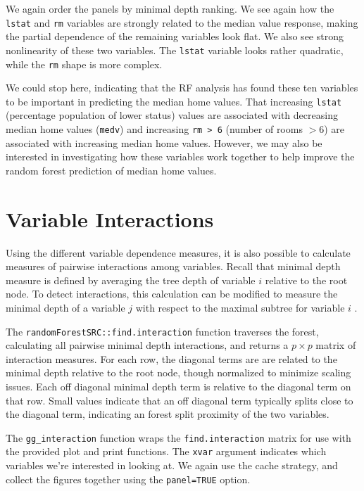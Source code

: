 \documentclass[article]{jss}
\begin{document}
We again order the panels by minimal depth ranking. We see again how the
\texttt{lstat} and \texttt{rm} variables are strongly related to the
median value response, making the partial dependence of the remaining
variables look flat. We also see strong nonlinearity of these two
variables. The \texttt{lstat} variable looks rather quadratic, while the
\texttt{rm} shape is more complex.

We could stop here, indicating that the RF analysis has found these ten
variables to be important in predicting the median home values. That
increasing \texttt{lstat} (percentage population of lower status) values
are associated with decreasing median home values (\texttt{medv}) and
increasing \texttt{rm\ \textgreater{}\ 6} (number of rooms \(> 6\)) are
associated with increasing median home values. However, we may also be
interested in investigating how these variables work together to help
improve the random forest prediction of median home values.

\section{Variable Interactions}\label{variable-interactions}

Using the different variable dependence measures, it is also possible to
calculate measures of pairwise interactions among variables. Recall that
minimal depth measure is defined by averaging the tree depth of variable
\(i\) relative to the root node. To detect interactions, this
calculation can be modified to measure the minimal depth of a variable
\(j\) with respect to the maximal subtree for variable \(i\)
\citep[\citet{Ishwaran:2011}]{Ishwaran:2010}.

The \texttt{randomForestSRC::find.interaction} function traverses the
forest, calculating all pairwise minimal depth interactions, and returns
a \(p \times p\) matrix of interaction measures. For each row, the
diagonal terms are are related to the minimal depth relative to the root
node, though normalized to minimize scaling issues. Each off diagonal
minimal depth term is relative to the diagonal term on that row. Small
values indicate that an off diagonal term typically splits close to the
diagonal term, indicating an forest split proximity of the two
variables.

The \texttt{gg\_interaction} function wraps the
\texttt{find.interaction} matrix for use with the provided plot and
print functions. The \texttt{xvar} argument indicates which variables
we're interested in looking at. We again use the cache strategy, and
collect the figures together using the \texttt{panel=TRUE} option.
\end{document}
